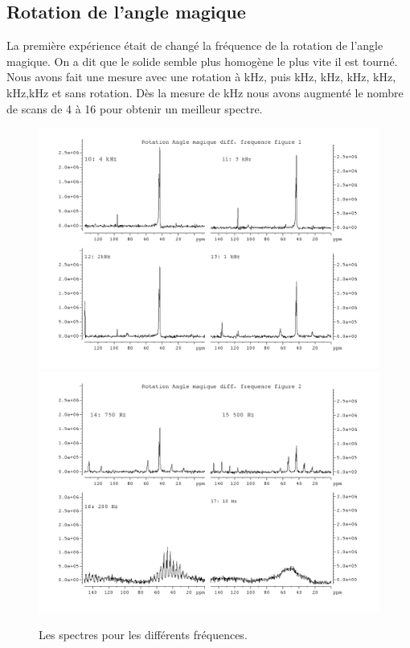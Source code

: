 \documentclass[a4paper,12pt]{scrartcl}
\begin{document}
  \subsection{Rotation de l'angle magique}
   La première expérience était de changé la fréquence de la rotation de l'angle magique. On a dit que le solide semble plus homogène le plus vite il est tourné. Nous avons fait une mesure avec une rotation à \unit[4]{kHz}, puis \unit[3]{kHz}, \unit[2]{kHz}, \unit[1]{kHz}, \unit[0,75]{kHz}, \unit[0,5]{kHz},\unit[0,2]{kHz} et sans rotation. Dès la mesure de \unit[0,75]{kHz} nous avons augmenté le nombre de scans de 4 à 16 pour obtenir un meilleur spectre. 
   \begin{figure}[H]
    \includegraphics[width=\textwidth]{bilder/rotation.png}
    \includegraphics[width=\textwidth]{bilder/rotation2.png}
    \caption{\label{rotation}Les spectres pour les différents fréquences.}
   \end{figure}
\end{document}
